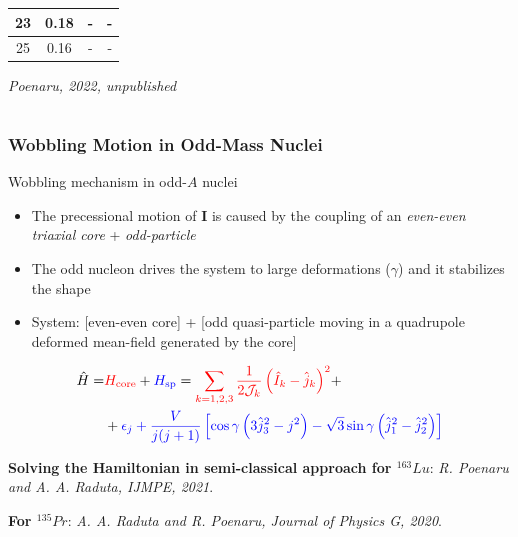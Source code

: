 \documentclass{beamer}
\begin{document}
\begin{frame}
\begin{columns}
\begin{column}{0.28\textwidth}
\begin{table}
{\begin{tabular}{|c|ccc|}
          23                   & \multicolumn{1}{c|}{0.18}       & \multicolumn{1}{c|}{-}           &  -            \\ \hline
          25                   & \multicolumn{1}{c|}{0.16}       & \multicolumn{1}{c|}{-}           &  -            \\ \hline
        \end{tabular}%
        }
      \end{table}
      \tiny{\emph{Poenaru, 2022, unpublished}}
      \end{column}
\end{columns}
\end{frame}

\begin{frame}
  \frametitle{Wobbling Motion in Odd-Mass Nuclei}
  \begin{block}{Wobbling mechanism in odd-$A$ nuclei}
    \begin{itemize}
      \item The precessional motion of $\mathbf{I}$ is caused by the coupling of an \emph{even-even triaxial core} + \emph{odd-particle}
      \item The odd nucleon drives the system to large deformations ($\gamma$) and it stabilizes the shape
      \item System: {\color{red}[even-even core]} + {\color{blue}[odd quasi-particle moving in a quadrupole deformed mean-field generated by the core]}
    \end{itemize}
  \end{block}
  {\small
  \begin{align}
    \hat{H}=&{\color{red}H_\text{core}}+{\color{blue}H_\text{sp}}={\color{red}\sum_{k=1,2,3}\frac{1}{2\mathcal{J}_k}\left(\hat{I}_k-\hat{j}_k\right)^2}+\nonumber\\
            &+{\color{blue}\epsilon_j+\frac{V}{j(j+1)}\left[\cos\gamma\left(3\hat{j}_3^2-j^2\right)-\sqrt{3}\sin\gamma\left(\hat{j}_1^2-\hat{j}_2^2\right)\right]}
  \end{align}}%
  \par{\tiny\textbf{Solving the Hamiltonian in semi-classical approach for $^{163}Lu$}: \textit{R. Poenaru and A. A. Raduta, IJMPE, 2021}.}
  \par{\tiny\textbf{For $^{135}Pr$}: \textit{A. A. Raduta and R. Poenaru, Journal of Physics G, 2020}.}
\end{frame}
\end{document}
